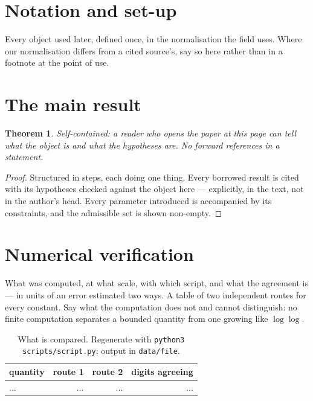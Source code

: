 \documentclass[11pt,a4paper]{article}
\newtheorem{theorem}{Theorem}\newtheorem{proposition}[theorem]{Proposition}
\theoremstyle{definition}\newtheorem{conjecture}[theorem]{Conjecture}
\theoremstyle{remark}\newtheorem{remark}[theorem]{Remark}
\begin{document}
\section{Notation and set-up}\label{sec:setup}
{{Every object used later, defined once, in the normalisation the field uses. Where our normalisation
differs from a cited source's, say so here rather than in a footnote at the point of use.}}

\section{{{The main result}}}\label{sec:main}

\begin{theorem}\label{thm:main}
{{Self-contained: a reader who opens the paper at this page can tell what the object is and what the
hypotheses are. No forward references in a statement.}}
\end{theorem}

\begin{proof}
{{Structured in steps, each doing one thing. Every borrowed result is cited with its hypotheses checked
against the object here --- explicitly, in the text, not in the author's head. Every parameter introduced
is accompanied by its constraints, and the admissible set is shown non-empty.}}
\end{proof}

\section{Numerical verification}\label{sec:numerics}
{{What was computed, at what scale, with which script, and what the agreement is --- in units of an error
estimated two ways. A table of two independent routes for every constant. Say what the computation does
not and cannot distinguish: no finite computation separates a bounded quantity from one growing like
$\log\log$.}}

\begin{table}[htbp]\centering\small
\caption{{{What is compared.}} Regenerate with \texttt{python3 scripts/{{script}}.py}; output in
\texttt{data/{{file}}}.}
\begin{tabular}{@{}lrrr@{}}\toprule
{{quantity}} & route 1 & route 2 & digits agreeing\\\midrule
{{...}} & {{...}} & {{...}} & {{...}}\\
\bottomrule\end{tabular}\end{table}
\end{document}
